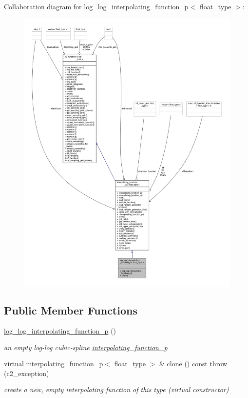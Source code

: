 Collaboration diagram for log\+\_\+log\+\_\+interpolating\+\_\+function\+\_\+p$<$ float\+\_\+type $>$\+:
\nopagebreak
\begin{figure}[H]
\begin{center}
\leavevmode
\includegraphics[width=350pt]{classlog__log__interpolating__function__p__coll__graph}
\end{center}
\end{figure}
\subsection*{Public Member Functions}
\begin{DoxyCompactItemize}
\item 
\hyperlink{classlog__log__interpolating__function__p_a7da92b61c290a647a51c027d06463b4e}{log\+\_\+log\+\_\+interpolating\+\_\+function\+\_\+p} ()
\begin{DoxyCompactList}\small\item\em an empty log-\/log cubic-\/spline \hyperlink{classinterpolating__function__p}{interpolating\+\_\+function\+\_\+p} \end{DoxyCompactList}\item 
virtual \hyperlink{classinterpolating__function__p}{interpolating\+\_\+function\+\_\+p}$<$ float\+\_\+type $>$ \& \hyperlink{classlog__log__interpolating__function__p_a637bcf13085568e0a5e6b9336873221c}{clone} () const   throw (c2\+\_\+exception)
\begin{DoxyCompactList}\small\item\em create a new, empty interpolating function of this type (virtual constructor) \end{DoxyCompactList}\end{DoxyCompactItemize}
